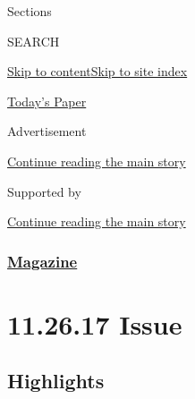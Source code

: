 Sections

SEARCH

\protect\hyperlink{site-content}{Skip to
content}\protect\hyperlink{site-index}{Skip to site index}

\href{https://myaccount.nytimes3xbfgragh.onion/auth/login?response_type=cookie\&client_id=vi}{}

\href{https://www.nytimes3xbfgragh.onion/section/todayspaper}{Today's
Paper}

Advertisement

\protect\hyperlink{after-top}{Continue reading the main story}

Supported by

\protect\hyperlink{after-sponsor}{Continue reading the main story}

\hypertarget{magazine}{%
\subsubsection{\texorpdfstring{\href{/section/magazine}{Magazine}}{Magazine}}\label{magazine}}

\hypertarget{112617-issue}{%
\section{11.26.17 Issue}\label{112617-issue}}

\hypertarget{highlights}{%
\subsection{Highlights}\label{highlights}}

